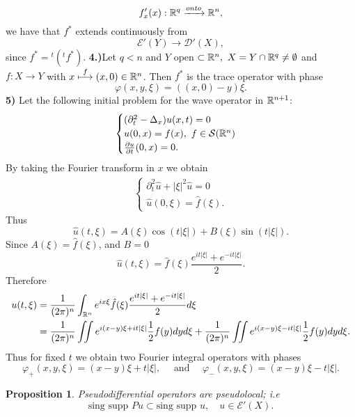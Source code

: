 \documentclass[12pt,reqno]{amsart}
\theoremstyle{plain}  %
\newtheorem{proposition}{Proposition}
\theoremstyle{definition}
\newcommand{\nin}{\noindent}
\newcommand{\vph}{\varphi}
\begin{document}
$$f'_x(x): \Bbb R^q
\xrightarrow{onto} \Bbb R^n,$$ we have that $f^*$ extends continuously from
$$\mathcal E'(Y) \longrightarrow \mathcal D'(X),$$
since $f^*={}^t({}^tf^*)$.
\vskip0.1in
\nin
{\bf 4.)}\quad  Let $q<n$ and $Y$ open
$\subset \Bbb R^n, \ X = Y \cap \Bbb R^q \ne \emptyset$ and
$f:X \longrightarrow Y$
with $x \overset{f}{\longmapsto} (x,0) \in \Bbb R^n$.
Then $f^*$ is the trace operator with phase
$$\vph(x,y,\xi) = ((x,0) - y)  \xi.$$
{\bf 5)} \quad   Let the following initial problem
for the wave operator in $\Bbb R^{n+1}$:
\begin{equation*}
	\begin{split}
	\begin{cases} (\partial^2_t-\Delta_x)u(x,t) = 0\\ 
u(0,x) = f(x),\ f \in \mathcal
S(\Bbb R^n)\\ 
\frac{\partial u}{\partial t} (0,x) = 0.
\end{cases} 
\end{split}
\end{equation*}
By taking the Fourier transform in $x$ we obtain 
\begin{equation*}
	\begin{split}
		\begin{cases} \partial^2_t \hat u + |\xi|^2
			\hat u = 0\\ \hat u (0,\xi) = \hat f(\xi).
		\end{cases}
		\end{split}
	\end{equation*}
Thus
$$\hat u(t,\xi) = A(\xi) \cos (t|\xi|) + B(\xi) \sin (t|\xi|).$$
Since $A(\xi) = \hat f(\xi)$,  and $B=0$
$$\hat u(t,\xi) = \hat f(\xi) \frac{e^{it|\xi|} + e^{-it|\xi|}}{2}.$$
Therefore
\begin{align*}
u(t,\xi) &= \frac{1}{(2\pi)^n} \int_{\Bbb R^n} e^{ix\xi}\hat f(\xi) 
\frac{e^{it|\xi|} + e^{-it|\xi|}}{2} d\xi\\
&= \frac{1}{(2\pi)^n} \iint e^{i(x-y)\xi+it|\xi|} \frac 12 f(y)dyd\xi +
\frac{1}{(2\pi)^n} \iint e^{i(x-y)\xi-it|\xi|} \frac 12
f(y)dyd\xi.\end{align*}
\nin
Thus for fixed $t$ we obtain two Fourier integral operators with phases
$$\vph_+(x,y,\xi) = (x-y) \xi + t|\xi|,\quad \text { and }
 \quad \vph_-(x,y,\xi) = (x-y) \xi - t|\xi|.$$
\bigskip
\begin{proposition} Pseudodifferential operators are pseudolocal; i.e
$$\text{sing supp } Pu \subset \text{sing supp } u,\quad u \in \mathcal
E'(X).$$
\end{proposition}
\end{document}
